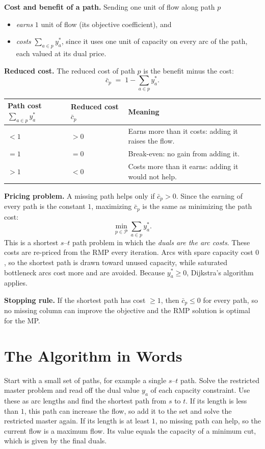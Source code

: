 \documentclass[11pt]{article}
\begin{document}
\textbf{Cost and benefit of a path.} Sending one unit of flow along path $p$
\begin{itemize}
  \item \emph{earns} $1$ unit of flow (its objective coefficient), and
  \item \emph{costs} $\sum_{a\in p} y_a^*$, since it uses one unit of capacity on every arc of the path, each valued at its dual price.
\end{itemize}

\textbf{Reduced cost.} The reduced cost of path $p$ is the benefit minus the cost:
\[
\bar c_p \;=\; 1-\sum_{a\in p} y_a^* .
\]
\begin{center}
\small
\begin{tabular}{@{}lll@{}}
\toprule
Path cost $\sum_{a\in p}y^*_a$ & Reduced cost $\bar c_p$ & Meaning \\
\midrule
$<1$ & $>0$ & Earns more than it costs: adding it raises the flow. \\
$=1$ & $=0$ & Break-even: no gain from adding it. \\
$>1$ & $<0$ & Costs more than it earns: adding it would not help. \\
\bottomrule
\end{tabular}
\end{center}

\textbf{Pricing problem.} A missing path helps only if $\bar c_p>0$. Since the earning of every path is the constant $1$, maximizing $\bar c_p$ is the same as minimizing the path cost:
\[
\min_{p\in\mathcal{P}} \sum_{a\in p} y_a^* .
\]
This is a shortest $s$--$t$ path problem in which the \emph{duals are the arc costs}. These costs are re-priced from the RMP every iteration. Arcs with spare capacity cost $0$, so the shortest path is drawn toward unused capacity, while saturated bottleneck arcs cost more and are avoided. Because $y_a^*\ge 0$, Dijkstra's algorithm applies.

\textbf{Stopping rule.} If the shortest path has cost $\ge 1$, then $\bar c_p\le 0$ for every path, so no missing column can improve the objective and the RMP solution is optimal for the MP.

\section{The Algorithm in Words}
Start with a small set of paths, for example a single $s$--$t$ path. Solve the restricted master problem and read off the dual value $y_a$ of each capacity constraint. Use these as arc lengths and find the shortest path from $s$ to $t$. If its length is less than $1$, this path can increase the flow, so add it to the set and solve the restricted master again. If its length is at least $1$, no missing path can help, so the current flow is a maximum flow. Its value equals the capacity of a minimum cut, which is given by the final duals.
\end{document}
